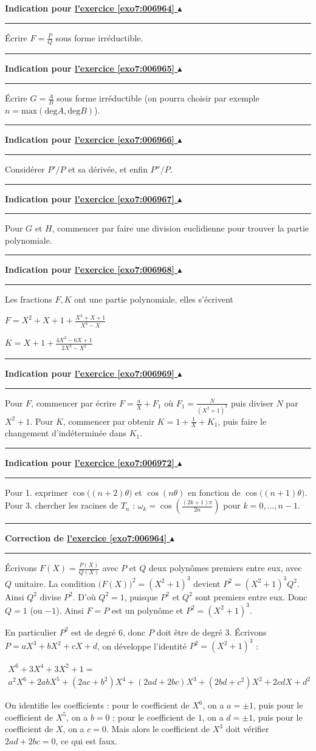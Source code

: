 \documentclass[11pt,a4paper]{article}
\newcommand{\finexercice}{}
\newcommand{\noindication}{}
\newcounter{exo}
\newcommand{\indication}[1]{\hypertarget{ind7:#1}{}\label{ind7:#1}{\bf Indication pour \hyperlink{exo7:#1}{l'exercice \ref{exo7:#1} $\blacktriangle$}}\vspace{1mm}\hrule\vspace{1mm}}
\newcommand{\finindication}{\vspace{1mm}\hrule\vspace*{7mm}}
\newcommand{\correction}[1]{\hypertarget{cor7:#1}{}\label{cor7:#1}{\bf Correction de \hyperlink{exo7:#1}{l'exercice \ref{exo7:#1} $\blacktriangle$}}\vspace{1mm}\hrule\vspace{1mm}}
\newcommand{\finenonces}{\newpage}
\newcommand{\finindications}{\newpage}
\begin{document}
\finexercice

\finfiche

 \finenonces 



 \finindications 

\indication{006964}
\'Ecrire $F=\frac{P}{Q}$ sous forme irréductible.
\finindication
\indication{006965}
\'Ecrire $G=\frac{A}{B}$ sous forme irréductible (on pourra choisir par exemple 
$n=\mathrm{max}(\mathrm{deg}A,\mathrm{deg}B)$).
\finindication
\indication{006966}
Considérer $P'/P$ et sa dérivée, et enfin $P''/P$.
\finindication
\indication{006967}
Pour $G$ et $H$, commencer par faire une division euclidienne 
pour trouver la partie polynomiale.
\finindication
\indication{006968}
Les fractions $F, K$ ont une partie polynomiale, elles s'écrivent

$F=X^2+X+1+\frac{X^2+X+1}{X^3-X}$

$K=X+1+\frac{4X^2-6X+1}{2X^3-X^2}$
\finindication
\indication{006969}
Pour $F$, commencer par écrire $F=\frac{a}{X}+F_1$ où $F_1=\frac{N}{(X^2+1)^3}$ puis diviser $N$ par $X^2+1$.
Pour $K$, commencer par obtenir $K=1+\frac{1}{X}+K_1$, puis faire le changement d'indéterminée dans $K_1$.
\finindication
\noindication
\noindication
\indication{006972}
Pour 1. exprimer $\cos\big((n+2)\theta\big)$ et $\cos(n\theta)$ 
en fonction de $\cos\big((n+1)\theta\big)$.
Pour 3. chercher les racines de $T_n$ : 
$\omega_k=\cos\left(\frac{(2k+1)\pi}{2n}\right)$ pour $k=0,\ldots,n-1$.
\finindication


\newpage

\correction{006964}
\'Ecrivons $F(X)=\frac{P(X)}{Q(X)}$ avec $P$ et $Q$ deux polynômes premiers entre eux, avec $Q$ unitaire.
La condition $\big(F(X)\big)^2=(X^2+1)^3$ devient $P^2=(X^2+1)^3Q^2$. 
Ainsi $Q^2$ divise $P^2$. D'où $Q^2=1$, puisque $P^2$ et $Q^2$ sont premiers entre eux. 
Donc $Q=1$ (ou $-1$). Ainsi $F=P$ est un polynôme et $P^2=(X^2+1)^3$. 

En particulier $P^2$ est de degré $6$, donc $P$ doit être de degré 3. 
\'Ecrivons $P=aX^3+bX^2+cX+d$,
on développe l'identité $P^2=(X^2+1)^3$ :

{\small
$$\begin{array}{c}
X^6+3X^4+3X^2+1 = \\
a^2X^6 + 2abX^5 + (2ac+b^2)X^4 + (2ad+2bc)X^3 + (2bd+c^2)X^2 + 2cdX+d^2
 \end{array}
$$
}

On identifie les coefficients :
pour le coefficient de $X^6$, on a $a=\pm1$,
puis pour le coefficient de $X^5$, on a $b =0$ ;
pour le coefficient de $1$, on a $d=\pm 1$, 
puis pour le coefficient de $X$, on a $c=0$.
Mais alors le coefficient de $X^3$ doit vérifier $2ad+2bc=0$, ce qui est faux.
\end{document}
